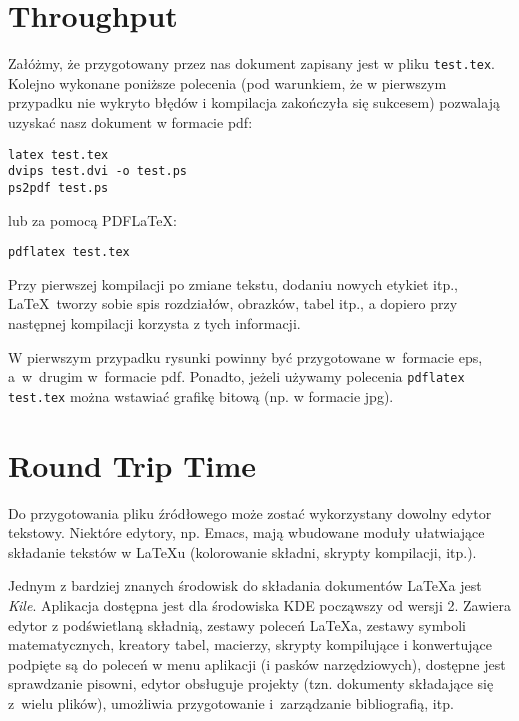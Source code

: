 
\section{Throughput}
\label{sec:throughput}


Załóżmy, że przygotowany przez nas dokument zapisany jest w pliku \texttt{test.tex}. Kolejno wykonane poniższe polecenia (pod warunkiem, że w pierwszym przypadku nie wykryto błędów i kompilacja zakończyła się sukcesem) pozwalają uzyskać nasz dokument w formacie pdf:
\begin{lstlisting}
latex test.tex
dvips test.dvi -o test.ps
ps2pdf test.ps
\end{lstlisting}
%
lub za pomocą PDF\LaTeX:
\begin{lstlisting}
pdflatex test.tex
\end{lstlisting}

Przy pierwszej kompilacji po zmiane tekstu, dodaniu nowych etykiet itp., \LaTeX~tworzy sobie spis rozdziałów, obrazków, tabel itp., a dopiero przy następnej kompilacji korzysta z tych informacji.

W pierwszym przypadku rysunki powinny być przygotowane w~formacie eps, a~w~drugim w~formacie pdf. Ponadto, jeżeli używamy polecenia \texttt{pdflatex test.tex} można wstawiać grafikę bitową (np. w formacie jpg).




\section{Round Trip Time}
\label{sec:rtt}


Do przygotowania pliku źródłowego może zostać wykorzystany dowolny edytor tekstowy. Niektóre edytory, np. Emacs, mają wbudowane moduły ułatwiające składanie tekstów w LaTeXu (kolorowanie składni, skrypty kompilacji, itp.).

Jednym z bardziej znanych środowisk do składania dokumentów  \LaTeX a jest {\em Kile}. Aplikacja dostępna jest dla środowiska KDE począwszy od wersji 2. Zawiera edytor z podświetlaną składnią, zestawy poleceń \LaTeX a, zestawy symboli matematycznych, kreatory tabel, macierzy, skrypty kompilujące i konwertujące podpięte są do poleceń w menu aplikacji (i pasków narzędziowych), dostępne jest sprawdzanie pisowni, edytor obsługuje projekty (tzn. dokumenty składające się z~wielu plików), umożliwia przygotowanie i~zarządzanie bibliografią, itp.

